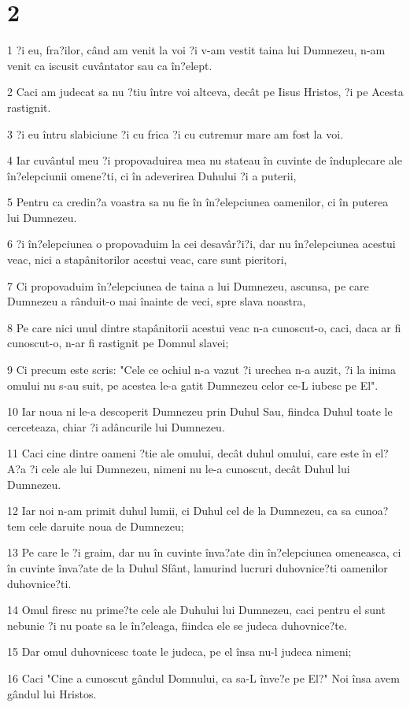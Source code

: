 \chapter{2}

\par 1 ?i eu, fra?ilor, când am venit la voi ?i v-am vestit taina lui Dumnezeu, n-am venit ca iscusit cuvântator sau ca în?elept.
\par 2 Caci am judecat sa nu ?tiu între voi altceva, decât pe Iisus Hristos, ?i pe Acesta rastignit.
\par 3 ?i eu întru slabiciune ?i cu frica ?i cu cutremur mare am fost la voi.
\par 4 Iar cuvântul meu ?i propovaduirea mea nu stateau în cuvinte de înduplecare ale în?elepciunii omene?ti, ci în adeverirea Duhului ?i a puterii,
\par 5 Pentru ca credin?a voastra sa nu fie în în?elepciunea oamenilor, ci în puterea lui Dumnezeu.
\par 6 ?i în?elepciunea o propovaduim la cei desavâr?i?i, dar nu în?elepciunea acestui veac, nici a stapânitorilor acestui veac, care sunt pieritori,
\par 7 Ci propovaduim în?elepciunea de taina a lui Dumnezeu, ascunsa, pe care Dumnezeu a rânduit-o mai înainte de veci, spre slava noastra,
\par 8 Pe care nici unul dintre stapânitorii acestui veac n-a cunoscut-o, caci, daca ar fi cunoscut-o, n-ar fi rastignit pe Domnul slavei;
\par 9 Ci precum este scris: "Cele ce ochiul n-a vazut ?i urechea n-a auzit, ?i la inima omului nu s-au suit, pe acestea le-a gatit Dumnezeu celor ce-L iubesc pe El".
\par 10 Iar noua ni le-a descoperit Dumnezeu prin Duhul Sau, fiindca Duhul toate le cerceteaza, chiar ?i adâncurile lui Dumnezeu.
\par 11 Caci cine dintre oameni ?tie ale omului, decât duhul omului, care este în el? A?a ?i cele ale lui Dumnezeu, nimeni nu le-a cunoscut, decât Duhul lui Dumnezeu.
\par 12 Iar noi n-am primit duhul lumii, ci Duhul cel de la Dumnezeu, ca sa cunoa?tem cele daruite noua de Dumnezeu;
\par 13 Pe care le ?i graim, dar nu în cuvinte înva?ate din în?elepciunea omeneasca, ci în cuvinte înva?ate de la Duhul Sfânt, lamurind lucruri duhovnice?ti oamenilor duhovnice?ti.
\par 14 Omul firesc nu prime?te cele ale Duhului lui Dumnezeu, caci pentru el sunt nebunie ?i nu poate sa le în?eleaga, fiindca ele se judeca duhovnice?te.
\par 15 Dar omul duhovnicesc toate le judeca, pe el însa nu-l judeca nimeni;
\par 16 Caci "Cine a cunoscut gândul Domnului, ca sa-L înve?e pe El?" Noi însa avem gândul lui Hristos.

